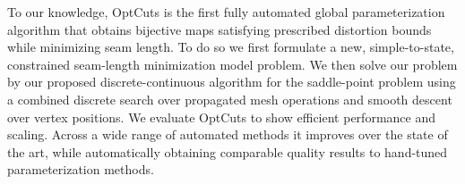 To our knowledge, OptCuts is the first fully automated global parameterization algorithm that obtains bijective maps satisfying prescribed distortion bounds while minimizing seam length. To do so we first formulate a new, simple-to-state, constrained seam-length minimization model problem. We then solve our problem by our proposed discrete-continuous algorithm for the saddle-point problem using a combined discrete search over propagated mesh operations and smooth descent over vertex positions. We evaluate OptCuts to show efficient performance and scaling. Across a wide range of automated methods it improves over the state of the art, while automatically obtaining comparable quality results to hand-tuned parameterization methods. 
